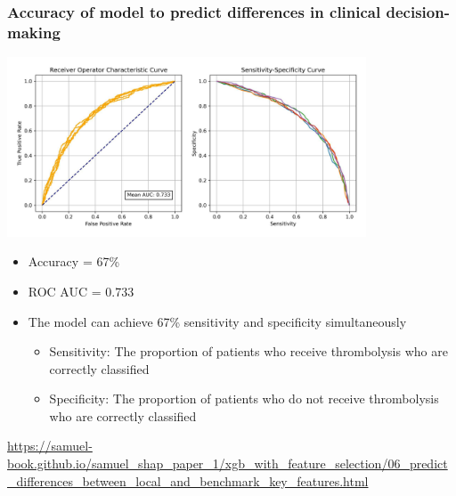 \documentclass[xcolor={usenames,dvipsnames}]{beamer}
\newcommand{\smallurl}[1]{\textcolor{blue}{\fontsize{4pt}{4.8pt}\selectfont \url{#1}}}
\begin{document}
\begin{frame}
\frametitle{Accuracy of model to predict differences in clinical decision-making}

\vspace{-0.5em}
\begin{center} 
\includegraphics[width=0.8\textwidth]{./images/accuracy_of_model_to_predict_differences_in_clinical_decision-making}
\end{center} 

\vspace{-1em}
\begin{itemize}
  \tiny
  \item Accuracy = 67\%
  \item ROC AUC = 0.733
  \item The model can achieve 67\% sensitivity and specificity simultaneously
  \begin{itemize}
    \tiny
    \item Sensitivity: The proportion of patients who receive thrombolysis who are correctly classified
    \item Specificity: The proportion of patients who do not receive thrombolysis who are correctly classified
  \end{itemize} 
\end{itemize} 


\smallurl{https://samuel-book.github.io/samuel_shap_paper_1/xgb_with_feature_selection/06_predict_differences_between_local_and_benchmark_key_features.html}

\end{frame}


\end{document}
